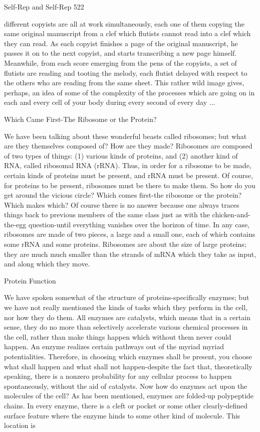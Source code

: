 {Self-Rep and Self-Rep                                                                     522

different copyists are all at work simultaneously, each one of them copying the same original
manuscript from a clef which flutists cannot read into a clef which they can read. As each
copyist finishes a page of the original manuscript, he passes it on to the next copyist, and
starts transcribing a new page himself. Meanwhile, from each score emerging from the pens
of the copyists, a set of flutists are reading and tooting the melody, each flutist delayed with
respect to the others who are reading from the same sheet. This rather wild image gives,
perhaps, an idea of some of the complexity of the processes which are going on in each and
every cell of your body during every second of every day ...

                     Which Came First-The Ribosome or the Protein?

We have been talking about these wonderful beasts called ribosomes; but what are they
themselves composed of? How are they made? Ribosomes are composed of two types of
things: (1) various kinds of proteins, and (2) another kind of RNA, called ribosomal RNA
(rRNA). Thus, in order for a ribosome to be made, certain kinds of proteins must be present,
and rRNA must be present. Of course, for proteins to be present, ribosomes must be there to
make them. So how do you get around the vicious circle? Which comes first-the ribosome or
the protein? Which makes which? Of course there is no answer because one always traces
things back to previous members of the same class just as with the chicken-and-the-egg
question-until everything vanishes over the horizon of time. In any case, ribosomes are made
of two pieces, a large and a small one, each of which contains some rRNA and some proteins.
Ribosomes are about the size of large proteins; they are much much smaller than the strands
of mRNA which they take as input, and along which they move.

                                      Protein Function

We have spoken somewhat of the structure of proteins-specifically enzymes; but we have not
really mentioned the kinds of tasks which they perform in the cell, nor how they do them. All
enzymes are catalysts, which means that in a certain sense, they do no more than selectively
accelerate various chemical processes in the cell, rather than make things happen which
without them never could happen. An enzyme realizes certain pathways out of the myriad
myriad potentialities. Therefore, in choosing which enzymes shall be present, you choose
what shall happen and what shall not happen-despite the fact that, theoretically speaking,
there is a nonzero probability for any cellular process to happen spontaneously, without the
aid of catalysts.
   Now how do enzymes act upon the molecules of the cell? As has been mentioned,
enzymes are folded-up polypeptide chains. In every enzyme, there is a cleft or pocket or
some other clearly-defined surface feature where the enzyme hinds to some other kind of
molecule. This location is




}
